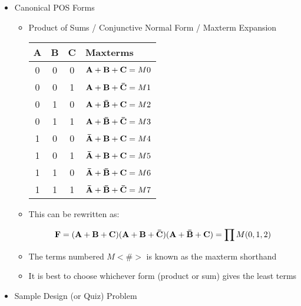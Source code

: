 \begin{itemize}

  \item Canonical POS Forms

    \begin{itemize}

      \item Product of Sums / Conjunctive Normal Form / Maxterm Expansion

        \begin{center}
          \begin{tabular}[h!]{c c c | l}
            \textbf{A} & \textbf{B} & \textbf{C} & Maxterms\\
            \hline
             0 & 0 & 0 & $\bold{A} + \bold{B} + \bold{C}= M0$\\
             0 & 0 & 1 & $\bold{A} + \bold{B} + \bold{\bar{C}}= M1$\\
             0 & 1 & 0 & $\bold{A} + \bold{\bar{B}} + \bold{C}= M2$\\
             0 & 1 & 1 & $\bold{A} + \bold{\bar{B}} + \bold{\bar{C}}= M3$\\
             1 & 0 & 0 & $\bold{\bar{A}} + \bold{B} + \bold{C}= M4$\\
             1 & 0 & 1 & $\bold{\bar{A}} + \bold{B} + \bold{C}= M5$\\
             1 & 1 & 0 & $\bold{\bar{A}} + \bold{\bar{B}} + \bold{C}= M6$\\
             1 & 1 & 1 & $\bold{\bar{A}} + \bold{\bar{B}} + \bold{\bar{C}}= M7$\\
             \hline
          \end{tabular}
        \end{center}

      \item This can be rewritten as:

        $$\bold{F}=(\bold{A}+\bold{B}+\bold{C})(\bold{A}+\bold{B}+\bold{\bar{C}})(\bold{A}+\bold{\bar{B}}+\bold{C})=\prod M(0,1,2)$$

      \item The terms numbered $M<\#>$ is known as the maxterm shorthand

      \item It is best to choose whichever form (product or sum) gives the least terms

    \end{itemize}

  \item Sample Design (or Quiz) Problem


\end{itemize}
